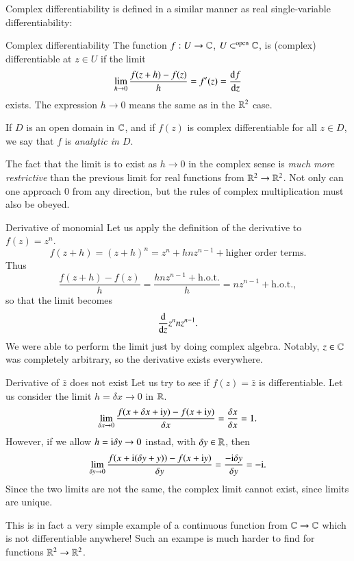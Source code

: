 Complex differentiability is defined in a similar manner as real single-variable differentiability:
\begin{myDefinition}{Complex differentiability}{}
    The function $f : U \to \mathbb{C}$, $U \subset^{\text{open}} \mathbb{C}$, is (complex) differentiable at $z \in U$ if the limit
    \begin{equation}
        \lim_{h \to 0} \frac{f(z+h) - f(z)}{h} = f'(z) = \frac{\mathrm{d} f}{\mathrm{d} z}
    \end{equation}
    exists. The expression $h\to 0$ means the same as in the $\mathbb{R}^2$ case.

    If $D$ is an open domain in $\mathbb{C}$, and if $f(z)$ is complex differentiable for all $z \in D$, we say that $f$ is \emph{analytic in $D$}.
\end{myDefinition}
The fact that the limit is to exist as $h\to 0$ in the complex sense is \emph{much more restrictive} than the previous limit for real functions from $\mathbb{R}^2\to\mathbb{R}^2$. Not only can one approach $0$ from any direction, but the rules of complex multiplication must also be obeyed.

\begin{myExample}{Derivative of monomial}{}
Let us apply the definition of the derivative to $f(z) = z^n$.
\begin{equation}
    f(z+h) = (z+h)^n = z^n + h n z^{n-1} + \text{higher order terms}.
\end{equation}
Thus
\begin{equation}
    \frac{f(z+h)-f(z)}{h} = \frac{h n z^{n-1} + \text{h.o.t.}}{h} = n z^{n-1} + \text{h.o.t.},
\end{equation}
so that the limit becomes
\begin{equation}
    \frac{\mathrm{d} }{\mathrm{d} z} z^{n} n z^{n-1}.
\end{equation}
We were able to perform the limit just by doing complex algebra. Notably, $z\in \mathbb{C}$ was completely arbitrary, so the derivative exists everywhere.
\end{myExample}

\begin{myExample}{Derivative of $\bar{z}$ does not exist}{}
Let us try to see if $f(z) = \bar{z}$ is differentiable. Let us consider the limit $h = \delta x \to 0$ in $\mathbb{R}$. 
\begin{equation}
    \lim_{\delta x\to 0} \frac{f(x + \delta x + \mathrm{i} y) - f(x + \mathrm{i} y)}{\delta x} = \frac{\delta x}{\delta x} = 1.
\end{equation}
However, if we allow $h = \mathrm{i} \delta y \to 0$ instad, with $\delta y\in \mathbb{R}$, then
\begin{equation}
    \lim_{\delta y\to 0} \frac{f(x + \mathrm{i} (\delta y + y)) - f(x + \mathrm{i} y)}{\delta y} = \frac{-\mathrm{i} \delta y}{\delta y} = -\mathrm{i}.
\end{equation}
Since the two limits are not the same, the complex limit cannot exist, since limits are unique.

This is in fact a very simple example of a continuous function from $\mathbb{C}\to\mathbb{C}$ which is not differentiable anywhere! Such an exampe is much harder to find for functions $\mathbb{R}^2\to\mathbb{R}^2$.
\end{myExample}

